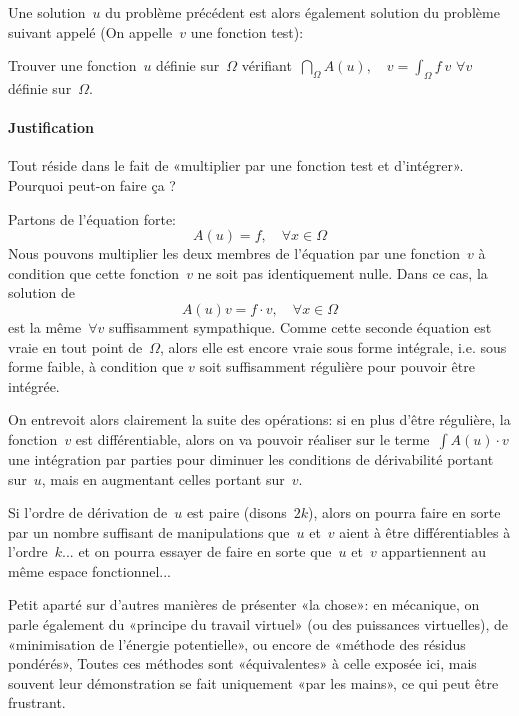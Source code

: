 \medskip
Une solution~$u$ du problème précédent est alors également solution du problème suivant
appelé  (On appelle~$v$ une fonction test):
\begin{center}
  Trouver une fonction~$u$ définie sur~$\Omega$ vérifiant~$\dint_\Omega A(u),\quad v = \int_\Omega f\ v$
$\forall v$ définie sur~$\Omega$.
\end{center}



\medskip{}%
\medskip

%


\paragraph{Justification}
Tout réside dans le fait de «multiplier par une fonction test et d'intégrer».
Pourquoi peut-on faire ça ?

Partons de l'équation forte:
\begin{equation}A(u)=f,\quad \forall x\in\Omega\end{equation}
Nous pouvons multiplier les deux membres de l'équation par une fonction~$v$ à
condition que cette fonction~$v$ ne soit pas identiquement nulle. Dans ce cas, la solution de
\begin{equation}A(u)v=f\cdot v,\quad \forall x\in\Omega\end{equation} est la même~$\forall v$ suffisamment sympathique.
Comme cette seconde équation est vraie en tout point de~$\Omega$, alors elle
est encore vraie sous forme intégrale, i.e. sous forme faible, à condition que
$v$ soit suffisamment régulière pour pouvoir être intégrée.

On entrevoit alors clairement la suite des opérations: si en plus d'être régulière,
la fonction~$v$ est différentiable, alors on va pouvoir réaliser sur le terme~$\int A(u)\cdot v$
une intégration par parties pour diminuer les conditions de dérivabilité portant sur~$u$,
mais en augmentant celles portant sur~$v$.

Si l'ordre de dérivation de~$u$ est paire (disons~$2k$), alors on pourra faire en sorte
par un nombre suffisant de manipulations que~$u$ et~$v$ aient à être différentiables
à l'ordre~$k$... et on pourra essayer de faire en sorte que~$u$ et~$v$ appartiennent au
même espace fonctionnel...

\medskip
{}
Petit aparté sur d'autres manières de présenter «la chose»:
en mécanique, on parle également du «principe du travail virtuel» (ou des puissances virtuelles),
de «minimisation de l'énergie potentielle», ou encore de «méthode des résidus pondérés»,
Toutes ces méthodes sont «équivalentes» à celle exposée ici, mais souvent
leur démonstration se fait uniquement «par les mains», ce qui peut être
frustrant.

